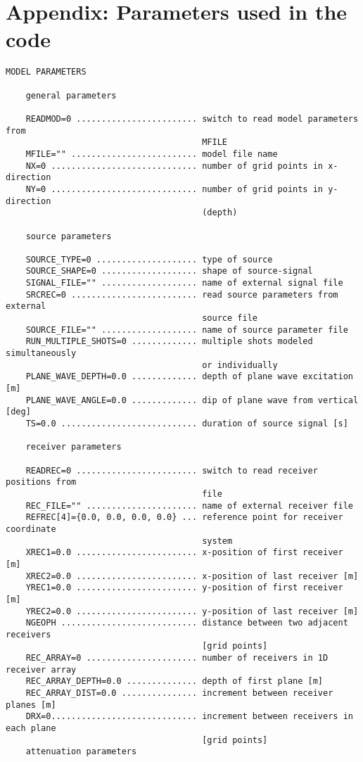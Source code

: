 \section{Appendix: Parameters used in the code}
\label{parameters}

\begin{verbatim}
MODEL PARAMETERS
    
    general parameters
    
    READMOD=0 ........................ switch to read model parameters from
                                       MFILE
    MFILE="" ......................... model file name
    NX=0 ............................. number of grid points in x-direction
    NY=0 ............................. number of grid points in y-direction
                                       (depth)
    
    source parameters
    
    SOURCE_TYPE=0 .................... type of source
    SOURCE_SHAPE=0 ................... shape of source-signal
    SIGNAL_FILE="" ................... name of external signal file
    SRCREC=0 ......................... read source parameters from external
                                       source file
    SOURCE_FILE="" ................... name of source parameter file
    RUN_MULTIPLE_SHOTS=0 ............. multiple shots modeled simultaneously
                                       or individually
    PLANE_WAVE_DEPTH=0.0 ............. depth of plane wave excitation [m]
    PLANE_WAVE_ANGLE=0.0 ............. dip of plane wave from vertical [deg]
    TS=0.0 ........................... duration of source signal [s]
    
    receiver parameters
    
    READREC=0 ........................ switch to read receiver positions from
                                       file
    REC_FILE="" ...................... name of external receiver file
    REFREC[4]={0.0, 0.0, 0.0, 0.0} ... reference point for receiver coordinate 
                                       system
    XREC1=0.0 ........................ x-position of first receiver [m]
    XREC2=0.0 ........................ x-position of last receiver [m]
    YREC1=0.0 ........................ y-position of first receiver [m]
    YREC2=0.0 ........................ y-position of last receiver [m]
    NGEOPH ........................... distance between two adjacent receivers 
                                       [grid points]
    REC_ARRAY=0 ...................... number of receivers in 1D receiver array
    REC_ARRAY_DEPTH=0.0 .............. depth of first plane [m] 
    REC_ARRAY_DIST=0.0 ............... increment between receiver planes [m]
    DRX=0............................. increment between receivers in each plane 
                                       [grid points]
    attenuation parameters
    

\end{verbatim}
